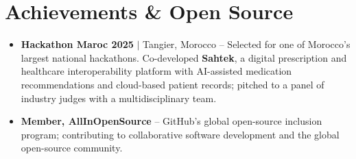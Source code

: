 \documentclass[9.5pt, a4paper]{article}
\begin{document}
\section{Achievements \& Open Source}
{\small
\begin{itemize}
  \item \textbf{Hackathon Maroc 2025} $|$ Tangier, Morocco -- Selected for one of Morocco's largest national hackathons. Co-developed \textbf{Sahtek}, a digital prescription and healthcare interoperability platform with AI-assisted medication recommendations and cloud-based patient records; pitched to a panel of industry judges with a multidisciplinary team.
  \item \textbf{Member, AllInOpenSource} -- GitHub's global open-source inclusion program; contributing to collaborative software development and the global open-source community.
\end{itemize}
}
\end{document}
